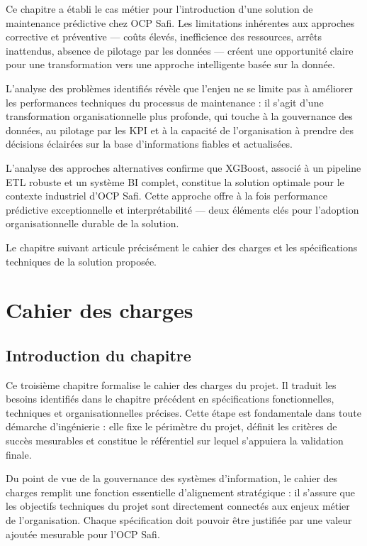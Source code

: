 \documentclass[a4paper,12pt]{report}
\begin{document}
Ce chapitre a établi le cas métier pour l'introduction d'une solution de maintenance prédictive chez OCP Safi. Les limitations inhérentes aux approches corrective et préventive — coûts élevés, inefficience des ressources, arrêts inattendus, absence de pilotage par les données — créent une opportunité claire pour une transformation vers une approche intelligente basée sur la donnée.

L'analyse des problèmes identifiés révèle que l'enjeu ne se limite pas à améliorer les performances techniques du processus de maintenance : il s'agit d'une transformation organisationnelle plus profonde, qui touche à la gouvernance des données, au pilotage par les KPI et à la capacité de l'organisation à prendre des décisions éclairées sur la base d'informations fiables et actualisées.

L'analyse des approches alternatives confirme que XGBoost, associé à un pipeline ETL robuste et un système BI complet, constitue la solution optimale pour le contexte industriel d'OCP Safi. Cette approche offre à la fois performance prédictive exceptionnelle et interprétabilité — deux éléments clés pour l'adoption organisationnelle durable de la solution.

Le chapitre suivant articule précisément le cahier des charges et les spécifications techniques de la solution proposée.


\chapter{Cahier des charges}

\section*{Introduction du chapitre}

Ce troisième chapitre formalise le cahier des charges du projet. Il traduit les besoins identifiés dans le chapitre précédent en spécifications fonctionnelles, techniques et organisationnelles précises. Cette étape est fondamentale dans toute démarche d'ingénierie : elle fixe le périmètre du projet, définit les critères de succès mesurables et constitue le référentiel sur lequel s'appuiera la validation finale.

Du point de vue de la gouvernance des systèmes d'information, le cahier des charges remplit une fonction essentielle d'alignement stratégique : il s'assure que les objectifs techniques du projet sont directement connectés aux enjeux métier de l'organisation. Chaque spécification doit pouvoir être justifiée par une valeur ajoutée mesurable pour l'OCP Safi.
\end{document}
